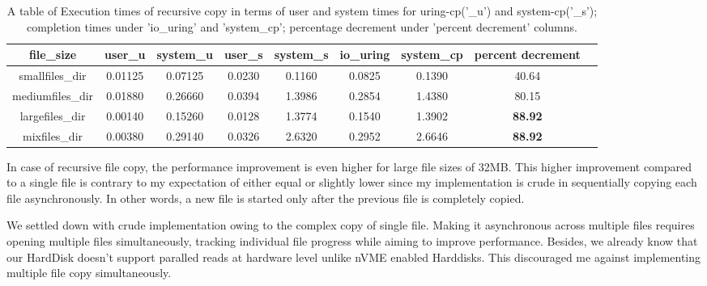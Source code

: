 \documentclass{article}
\begin{document}
\begin{table}
\centering
\begin{tabular}{|c|c|c|c|c|c|c|c|c|}

    \hline
    file\_size & user\_u & system\_u & user\_s & system\_s & io\_uring & system\_cp & percent decrement\\
    \hline                                                                                        
    smallfiles\_dir  &0.01125 & 0.07125& 0.0230 &  0.1160  & 0.0825 &   0.1390  &  40.64\\
    \hline                                                                                        
    mediumfiles\_dir &0.01880 & 0.26660& 0.0394 &  1.3986  & 0.2854 &   1.4380  &  80.15\\
    \hline                                                                                        
    largefiles\_dir  &0.00140 & 0.15260& 0.0128 &  1.3774  & 0.1540 &   1.3902  &  \textbf{88.92}\\
    \hline                                                                                        
    mixfiles\_dir    &0.00380 & 0.29140& 0.0326 &  2.6320  & 0.2952 &   2.6646  &  \textbf{88.92}\\
    \hline                                                                                        
     
\end{tabular}
\caption{\label{tab:widgets}A table of Execution times of recursive copy 
in terms of user and system times for uring-cp('\_u') 
and system-cp('\_s'); completion times under 'io\_uring' and 'system\_cp'; percentage decrement under 
'percent decrement' columns.}
\vspace{0.5cm}
\end{table}


In case of recursive file copy, the performance improvement is even higher for large file sizes of 32MB. This higher improvement 
compared to a single file is contrary to my expectation of either equal or slightly lower since my implementation is crude in 
sequentially copying each file asynchronously. In other words, a new file is started only after the previous file is completely 
copied.

We settled down with crude implementation owing to the complex copy of single file. Making it asynchronous across multiple files 
requires opening multiple files simultaneously, tracking individual file progress while aiming to improve performance. Besides, 
we already know that our HardDisk doesn’t support paralled reads at hardware level unlike nVME enabled Harddisks. This discouraged 
me against implementing multiple file copy simultaneously.
\end{document}
